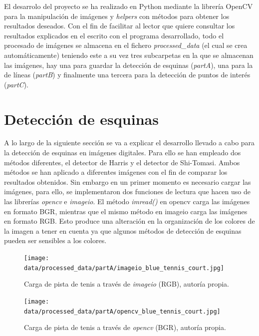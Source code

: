 \documentclass[a4paper,12pt]{article}
\begin{document}
{\vspace{0.5cm}

El desarrolo del proyecto se ha realizado en Python mediante la librería OpenCV para la manipulación de imágenes y \textit{helpers} con métodos para obtener 
los resultados deseados. Con el fin de facilitar al lector que quiere consultar los resultados explicados en el escrito con el programa desarrollado, 
todo el procesado de imágenes se almacena en el fichero \textit{processed\_data} (el cual se crea automáticamente) teniendo este a su vez tres subcarpetas 
en la que se almacenan las imágenes, hay una para guardar la detección de esquinas (\textit{partA}), una para la de líneas (\textit{partB}) y finalmente una 
tercera para la detección de puntos de interés (\textit{partC}).

\newpage


\section{Detección de esquinas}


\vspace{1.cm}

A lo largo de la siguiente sección se va a explicar el desarrollo llevado a cabo para la detección de esquinas en imágenes digitales. Para ello se han empleado dos 
métodos diferentes, el detector de Harris y el detector de Shi-Tomasi. Ambos métodos se han aplicado a diferentes imágenes con el fin de comparar los resultados 
obtenidos. Sin embargo en un primer momento es necesario cargar las imágenes, para ello, se implementaron dos funciones de lectura que hacen uso de las librerías 
\textit{opencv} e \textit{imageio}. El método \textit{imread()} en opencv carga las imágenes en formato BGR, mientras que el mismo método en imageio carga las
imágenes en formato RGB. Esto produce una alteración en la organización de los colores de la imagen a tener en cuenta ya que algunos métodos de detección de esquinas
pueden ser sensibles a los colores.

\vspace{0.5cm}

\begin{figure}[h!]
    \centering
    \begin{minipage}[b]{0.45\textwidth}
        \centering
        \texttt{[image: data/processed\_data/partA/imageio\_blue\_tennis\_court.jpg]}
        \caption{Carga de pista de tenis a través de \textit{imageio} (RGB), autoría propia.}
        \label{fig:tennis-imageio}
    \end{minipage}
    \hfill
    \begin{minipage}[b]{0.45\textwidth}
        \centering
        \texttt{[image: data/processed\_data/partA/opencv\_blue\_tennis\_court.jpg]}
        \caption{Carga de pista de tenis a través de \textit{opencv} (BGR), autoría propia.}
        \label{fig:tennis-opencv}
    \end{minipage}


\end{figure}}
\end{document}
